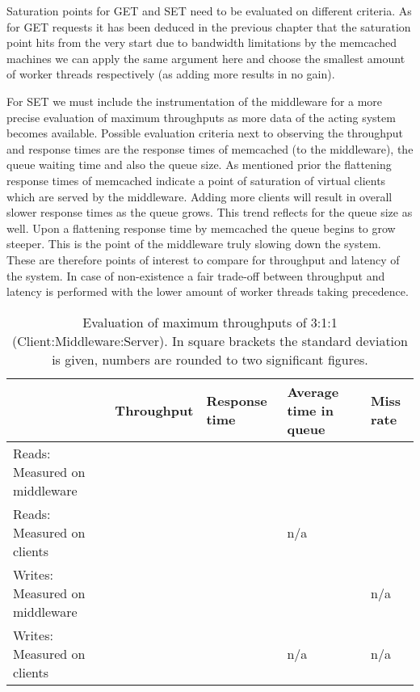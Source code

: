    Saturation points for GET and SET need to be evaluated on different criteria. As for GET requests it has been
    deduced in the previous chapter that the saturation point hits from the very start due to bandwidth limitations by
    the memcached machines we can apply the same argument here and choose the smallest amount of worker threads
    respectively (as adding more results in no gain).

    For SET we must include the instrumentation of the middleware for a more precise evaluation of maximum throughputs
    as more data of the acting system becomes available. Possible evaluation criteria next to observing the throughput
    and response times are the response times of memcached (to the middleware), the queue waiting time and also the
    queue size.  As mentioned prior the flattening response times of memcached indicate a point of saturation of virtual
    clients which are served by the middleware. Adding more clients will result in overall slower response times as the
    queue grows. This trend reflects for the queue size as well. Upon a flattening response time by memcached the queue
    begins to grow steeper. This is the point of the middleware truly slowing down the system. These are therefore
    points of interest to compare for throughput and latency of the system. In case of non-existence a fair trade-off
    between throughput and latency is performed with the lower amount of worker threads taking precedence.

    \begin{table}
        \begin{tabular}{|l|p{2cm}|p{2cm}|p{2cm}|p{2cm}|}
            \hline                                & Throughput & Response time & Average time in queue & Miss rate \\
            \hline Reads: Measured on middleware  &            &               &                       & \\
            \hline Reads: Measured on clients     &            &               & n/a                   & \\
            \hline Writes: Measured on middleware &            &               &                       & n/a       \\
            \hline Writes: Measured on clients    &            &               & n/a                   & n/a       \\
            \hline 
        \end{tabular}
        \caption{Evaluation of maximum throughputs of 3:1:1 (Client:Middleware:Server). In square brackets the standard
                 deviation is given, numbers are rounded to two significant figures.\label{tab:31_throughput}}
    \end{table}

